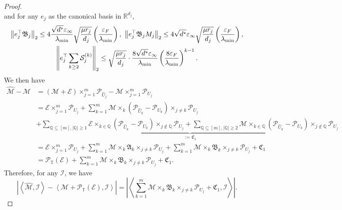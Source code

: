 \documentclass[12pt]{article}
\newcommand{\tF}{{\rm F}}
\newcommand{\abs}[1]{\left\lvert#1\right\rvert}
\newcommand{\norm}[1]{\left\lVert#1\right\rVert}
\newcommand{\R}{\mathbb{R}}
\newcommand{\cE}{\mathcal{E}}
\newcommand{\cP}{\mathcal{P}}
\newcommand{\cM}{\mathcal{M}}
\newcommand{\cI}{\mathcal{I}}
\newcommand{\cS}{\mathcal{S}}
\def\QQ{{\mathbb Q}}
\def\TT{{\mathbb T}}
\theoremstyle{plain}
\begin{document}
\begin{proof}
\begin{equation}
\end{equation}
and for any $e_j$ as the canonical basis in $\R^{d_j}$,
\begin{equation}\label{eq:tensor-hod}
\begin{gathered}
    \norm{e_{j}^\top\mathfrak{B}_j}_2 \le  4 \frac{  \sqrt{d^*}\varepsilon_{\infty}}{\lambda_{\min}} \sqrt{\frac{\mu r_j}{d_j} } \left(\frac{\varepsilon_{\tF}}{\lambda_{\min}}\right), \   \norm{e_{j}^\top\mathfrak{B}_j M_j}_2 \le  4 \sqrt{d^*}\varepsilon_{\infty} \sqrt{\frac{\mu r_j}{d_j} } \left(\frac{\varepsilon_{\tF}}{\lambda_{\min}}\right),
\\
   \norm{ e_{j}^\top\sum_{k\ge 2} \cS_{j }^{(k)} }_2\le \sqrt{\frac{\mu r_j}{d_j} } \cdot\frac{8  \sqrt{d^*}\varepsilon_{\infty}}{\lambda_{\min}} \left(\frac{8 \varepsilon_{\tF}  }{\lambda_{\min}}\right)^{k-1} .
\end{gathered}
\end{equation}
We then have
\begin{equation}\label{eq:tensor-decomp-1}
    \begin{aligned}
       \widehat{\cM}-\cM &=   (\cM+\cE) \times_{j=1}^m \cP_{\widehat{U}_j} - \cM\times_{j=1}^m \cP_{{U}_j} 
       \\
       &= \cE\times_{j=1}^m \cP_{{U}_j} + \sum_{k=1}^{m} \cM \times_k \left( \cP_{\widehat{U}_{k}} - \cP_{U_k}\right)\times_{j\neq k} \cP_{{U}_j} 
       \\
       & + \underbrace{\sum_{\QQ\subseteq [m],\abs{\QQ}\ge 1 } \cE \times_{k\in\QQ} \left( \cP_{\widehat{U}_{k}} - \cP_{U_k}\right)\times_{j\notin \QQ} \cP_{{U}_j}   + \sum_{\QQ\subseteq [m],\abs{\QQ}\ge 2 } \cM \times_{k\in\QQ} \left( \cP_{\widehat{U}_{k}} - \cP_{U_k}\right)\times_{j\notin \QQ} \cP_{{U}_j}  }_{:=\mathfrak{C}_1}
       \\
       & = \cE\times_{j=1}^m \cP_{{U}_j} + \sum_{k=1}^{m} \cM \times_k \mathfrak{A}_k\times_{j\neq k} \cP_{{U}_j} + \sum_{k=1}^{m} \cM \times_k \mathfrak{B}_k\times_{j\neq k} \cP_{{U}_j}  +\mathfrak{C}_1
       \\
       & = \cP_{\TT}(\cE) + \sum_{k=1}^{m} \cM \times_k \mathfrak{B}_k\times_{j\neq k} \cP_{{U}_j}  +\mathfrak{C}_1.
    \end{aligned}
\end{equation}
Therefore, for any $\cI$, we have  
$$ \abs{\left\langle \widehat{\cM},\cI \right\rangle-\left\langle\cM +\cP_{\TT}(\cE),\cI \right\rangle} =  \abs{\left\langle  \sum_{k=1}^{m} \cM \times_k \mathfrak{B}_k\times_{j\neq k} \cP_{{U}_j}  +\mathfrak{C}_1,\cI \right\rangle}. $$

\end{proof}
\end{document}
